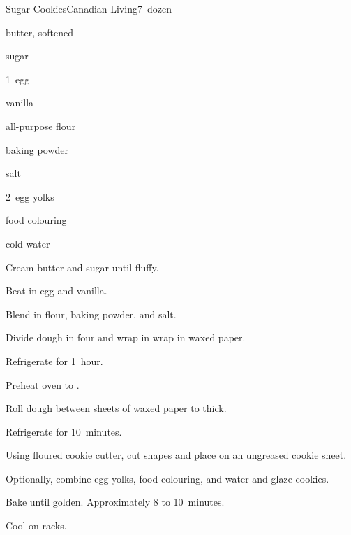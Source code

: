 \begin{recipe}{Sugar Cookies}{Canadian Living}{7~dozen}

\begin{ingredients}
\item {} butter, softened
\item {} sugar
\item 1~egg
\item \tp{\half} vanilla
\item {} all-purpose flour
\item \tp{1\half} baking powder
\item \tp{\quarter} salt
\item 2~egg yolks
\item food colouring
\item \tp{\half} cold water
\end{ingredients}

\begin{directions}
\item Cream butter and sugar until fluffy.
\item Beat in egg and vanilla.
\item Blend in flour, baking powder, and salt.
\item Divide dough in four and wrap in wrap in waxed paper.
\item Refrigerate for 1~hour.
\item Preheat oven to .
\item Roll dough between sheets of waxed paper to \inch{\eighth} thick.
\item Refrigerate for 10~minutes.
\item Using floured cookie cutter, cut shapes and place on an ungreased cookie sheet.
\item Optionally, combine egg yolks, food colouring, and water and glaze cookies.
\item Bake until golden. Approximately 8 to 10~minutes.
\item Cool on racks.
\end{directions}

\end{recipe}
